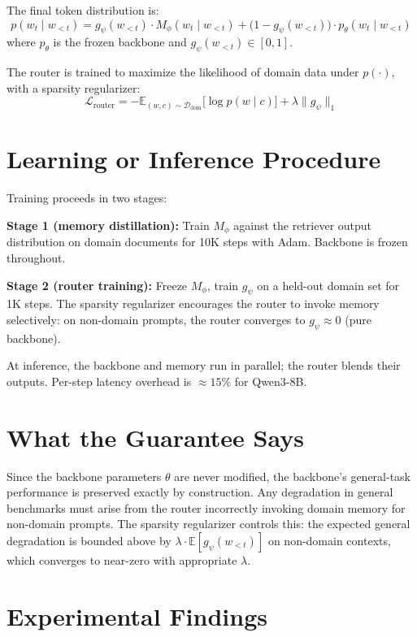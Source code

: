 \documentclass[10pt,twocolumn]{article}
\begin{document}
The final token distribution is:
\[
  p(w_t \mid w_{<t}) =
    g_\psi(w_{<t}) \cdot M_\phi(w_t \mid w_{<t})
    + \bigl(1 - g_\psi(w_{<t})\bigr) \cdot p_\theta(w_t \mid w_{<t})
\]
where $p_\theta$ is the frozen backbone and $g_\psi(w_{<t}) \in [0,1]$.

The router is trained to maximize the likelihood of domain data under
$p(\cdot)$, with a sparsity regularizer:
\[
  \mathcal{L}_{\text{router}} =
    -\mathbb{E}_{(w,c)\sim\mathcal{D}_{\mathrm{dom}}}\!\bigl[
      \log p(w \mid c)
    \bigr] + \lambda \|g_\psi\|_1
\]

\section{Learning or Inference Procedure}

Training proceeds in two stages:

\textbf{Stage 1 (memory distillation):} Train $M_\phi$ against the
retriever output distribution on domain documents for 10K steps with Adam.
Backbone is frozen throughout.

\textbf{Stage 2 (router training):} Freeze $M_\phi$, train $g_\psi$ on a
held-out domain set for 1K steps. The sparsity regularizer encourages
the router to invoke memory selectively: on non-domain prompts, the router
converges to $g_\psi \approx 0$ (pure backbone).

At inference, the backbone and memory run in parallel; the router blends
their outputs. Per-step latency overhead is $\approx 15\%$ for Qwen3-8B.

\section{What the Guarantee Says}

Since the backbone parameters $\theta$ are never modified, the backbone's
general-task performance is preserved exactly by construction. Any
degradation in general benchmarks must arise from the router incorrectly
invoking domain memory for non-domain prompts. The sparsity regularizer
controls this: the expected general degradation is bounded above by
$\lambda \cdot \mathbb{E}[g_\psi(w_{<t})]$ on non-domain contexts, which
converges to near-zero with appropriate $\lambda$.

\section{Experimental Findings}
\end{document}

